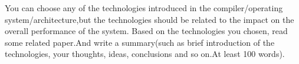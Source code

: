\begin{exercise}[]{You can choose any of the technologies introduced in the compiler/operating system/architecture,but the technologies should be related to the impact on the overall performance of the system. Based on the technologies you chosen, read some related paper.And write a summary(such as brief introduction of the technologies, your thoughts, ideas, conclusions and so on.At least 100 words). }
  \begin{solution}
  \par{~}
  \end{solution}
  \label{ex4}
\end{exercise}